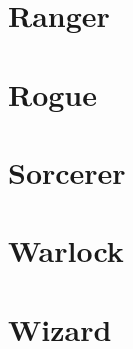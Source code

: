 \documentclass[./main.tex]{subfiles}
\begin{document}
\clearpage

\section{Ranger}


\clearpage

\section{Rogue}


\clearpage

\section{Sorcerer}



\clearpage

\section{Warlock}


\clearpage

\section{Wizard}


\clearpage
\end{document}
